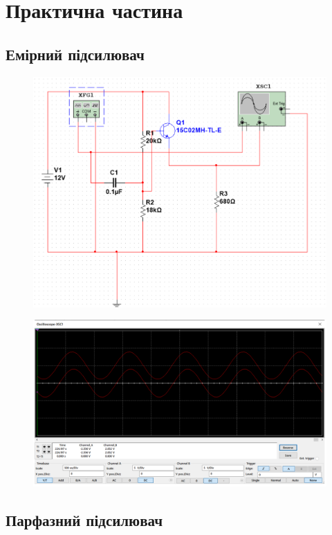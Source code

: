 \section{Практична частина}
\subsection{Емірний підсилювач}
\setlength{\parindent}{4em}



\begin{figure}[ht]
\centering
\includegraphics[width=0.7\linewidth]{Pic/first_1.png}
\end{figure}


\begin{figure}[ht]
\centering
\includegraphics[width=0.9\linewidth]{Pic/first_2.png}
\end{figure}
\newpage

\subsection{Парфазний підсилювач}
\setlength{\parindent}{4em}



